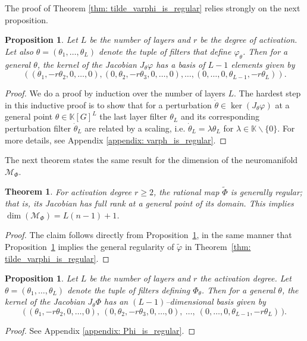 \documentclass[final]{article}
\newcommand{\K}{\mathbb{K}}
\theoremstyle{definition}
\theoremstyle{plain}
\newtheorem{theorem}[definition]{Theorem}
\newtheorem{proposition}[definition]{Proposition}
\begin{document}
The proof of Theorem \ref{thm: tilde_varphi_is_regular} relies strongly on the next proposition.
\begin{proposition}\label{prop: Jvarphi_kernel_has-dim_L-1}
    Let $L$ be the number of layers and $r$ be the degree of activation.
    Let also $\theta = (\theta_1, \hdots, \theta_L)$ denote the tuple of filters that define $\varphi_\theta$.
    Then for a general $\theta$, the kernel of the Jacobian $J_\theta\varphi$ has a basis of $L-1$ elements given by 
    \[
    \left((\theta_1, -r\theta_2, 0, \hdots, 0), (0, \theta_2, -r\theta_3, 0, \hdots, 0), \hdots, (0, \hdots, 0, \theta_{L-1}, -r\theta_L)\right).
    \]
\end{proposition}
\begin{proof}
    We do a proof by induction over the number of layers $L$. 
    The hardest step in this inductive proof is to show that for a perturbation $\dot \theta \in \ker(J_\theta \varphi)$ at a general point $\theta \in \K[G]^L$ the last layer filter $\theta_L$ and its corresponding perturbation filter $\dot \theta_L$ are related by a scaling, i.e. $\dot \theta_L = \lambda \theta_L$ for $\lambda \in \K\backslash\{0\}$. 
    For more details, see Appendix \ref{appendix: varph_is_regular}.
\end{proof}

The next theorem states the same result for the dimension of the neuromanifold $\mathcal{M}_\Phi$.

\begin{theorem}\label{thm: tilde_Phi_is_regular}
For activation degree $r\geq 2$, the rational map \(\tilde\Phi\) is \emph{generally regular}; that is, its Jacobian has full rank at a general point of its domain.
This implies  $\dim(\mathcal{M}_\Phi)=L(n-1) + 1$.
\end{theorem}

\begin{proof}
The claim follows directly from Proposition~\ref{prop: JPhi_kernel_has_dim_L-1}, 
in the same manner that 
Proposition~\ref{prop: Jvarphi_kernel_has-dim_L-1}
implies the general regularity of \(\tilde\varphi\) in 
Theorem~\ref{thm: tilde_varphi_is_regular}.
\end{proof}

\begin{proposition}\label{prop: JPhi_kernel_has_dim_L-1}
    Let $L$ be the number of layers and $r$ the activation degree.
    Let $\theta = (\theta_1,\dots,\theta_L)$ denote the tuple of filters defining $\Phi_\theta$.
    Then for a general $\theta$, the kernel of the Jacobian $J_\theta\Phi$ has an $(L-1)$--dimensional basis given by
    \[
    \bigl(\,(\theta_1,-r\theta_2,0,\dots,0),\ (0,\theta_2,-r\theta_3,0,\dots,0),\ \dots,\ (0,\dots,0,\theta_{L-1},-r\theta_L)\,\bigr).
    \]
\end{proposition}
\begin{proof}
    See Appendix \ref{appendix: Phi_is_regular}.
\end{proof}
\end{document}

